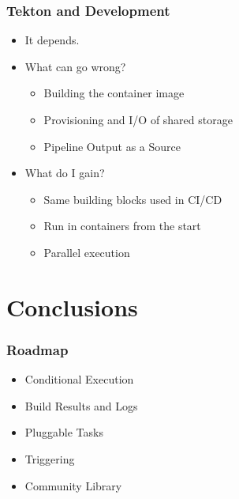 \documentclass[aspectratio=169,11pt,hyperref={colorlinks=true}]{beamer}
\begin{document}
\begin{lblackrwhiteframe}
\begin{blackframe}
\begin{grayframe}
  \frametitle{Tekton and Development}
  \begin{itemize}
    \item It depends.
    \item What can go wrong?
    \begin{itemize}
      \item Building the container image
      \item Provisioning and I/O of shared storage
      \item Pipeline Output as a Source
    \end{itemize}
    \item What do I gain?
    \begin{itemize}
      \item Same building blocks used in CI/CD
      \item Run in containers from the start
      \item Parallel execution
    \end{itemize}
  \end{itemize}
\end{grayframe}

\section{Conclusions}

\begin{grayframe}
  \frametitle{Roadmap}
  \begin{itemize}
    \item Conditional Execution
    \item Build Results and Logs
    \item Pluggable Tasks
    \item Triggering
    \item Community Library
  \end{itemize}
\end{grayframe}


\end{blackframe}
\end{lblackrwhiteframe}
\end{document}
